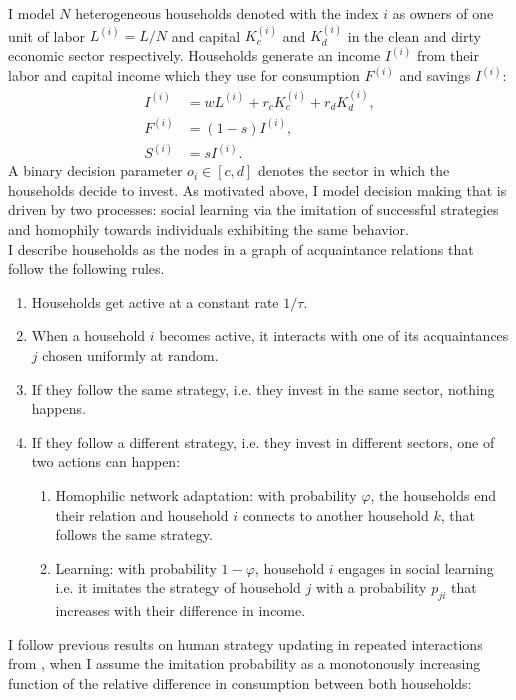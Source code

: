 I model $N$ heterogeneous households denoted with the index $i$ as owners of one unit of labor $L^{(i)} = L/N$ and capital $K_c^{(i)}$ and $K_d^{(i)}$ in the clean and dirty economic sector respectively.
Households generate an income $I^{(i)}$ from their labor and capital income which they use for consumption $F^{(i)}$ and savings $I^{(i)}$:
\begin{align}
	I^{(i)} &= w L^{(i)} + r_c K_c^{(i)} + r_d K_d^{(i)}, \label{eq:approx_hi} \\
	F^{(i)} &= (1-s) I^{(i)}, \label{eq:approx_c} \\
	S^{(i)} &= s I^{(i)}. \label{eq:approx_s}
\end{align}
A binary decision parameter $o_i \in [c,d]$ denotes the sector in which the households decide to invest. As motivated above, I model decision making that is driven by two processes: social learning via the imitation of successful strategies and homophily towards individuals exhibiting the same behavior. \\
I describe households as the nodes in a graph of acquaintance relations that follow the following rules. 
\begin{enumerate}
  \item Households get active at a constant rate $1/\tau$. \label{r1}
        \item When a household $i$ becomes active, it interacts with one of its acquaintances $j$ chosen uniformly at random. 
        \item If they follow the same strategy, i.e. they invest in the same sector, nothing happens. 
        \item If they follow a different strategy, i.e. they invest in different sectors, one of two actions can happen:
        \begin{enumerate}
                \item Homophilic network adaptation: with probability $\varphi$, the households end their relation and household $i$ connects to another household $k$, that follows the same strategy. 
                \item Learning: with probability $1-\varphi$, household $i$ engages in social learning i.e. it imitates the strategy of household $j$ with a probability $p_{ji}$ that increases with their difference in income. \label{rn}
        \end{enumerate}
\end{enumerate}
I follow previous results on human strategy updating in repeated interactions from \cite{Traulsen2010}, when I assume the imitation probability as a monotonously increasing function of the relative difference in consumption between both households:

